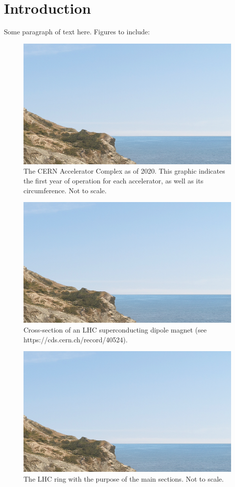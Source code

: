 
\chapter*{Introduction}

\label{Introduction} %


Some paragraph of text here.
Figures to include:

\begin{figure}[h]
  \centering
  \includegraphics*[width=0.5\columnwidth]{Figures/placeholder.png}
  \caption{The CERN Accelerator Complex as of 2020. This graphic indicates the first year of operation for each accelerator, as well as its circumference. Not to scale.}
  \label{fig:cern_accelerator_complex}
\end{figure}


\begin{figure}[h]
  \centering
  \includegraphics*[width=0.5\columnwidth]{Figures/placeholder.png}
  \caption{Cross-section of an LHC superconducting dipole magnet (see https://cds.cern.ch/record/40524).}
  \label{fig:lhc_dipole_crosssection}
\end{figure}


\begin{figure}[h]
  \centering
  \includegraphics*[width=0.5\columnwidth]{Figures/placeholder.png}
  \caption{The LHC ring with the purpose of the main sections. Not to scale.}
  \label{fig:lhc_ring_sections}
\end{figure}

